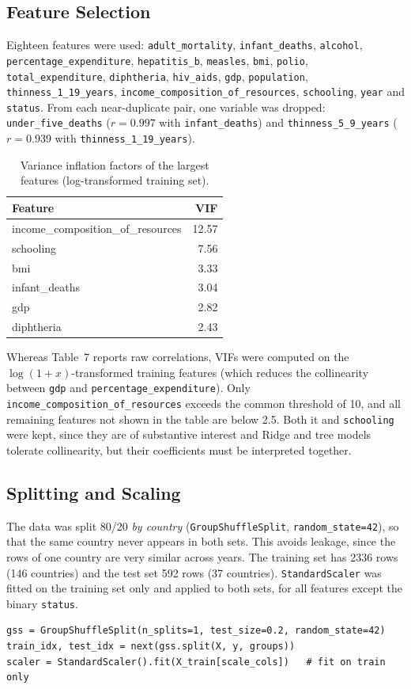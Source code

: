 \documentclass[12pt,a4paper]{article}
\begin{document}
\subsection{Feature Selection}
Eighteen features were used: \texttt{adult\_mortality}, \texttt{infant\_deaths}, \texttt{alcohol},
\texttt{percentage\_expenditure}, \texttt{hepatitis\_b}, \texttt{measles}, \texttt{bmi},
\texttt{polio}, \texttt{total\_expenditure}, \texttt{diphtheria}, \texttt{hiv\_aids}, \texttt{gdp},
\texttt{population}, \texttt{thinness\_1\_19\_years}, \texttt{income\_composition\_of\_resources},
\texttt{schooling}, \texttt{year} and \texttt{status}. From each near-duplicate pair, one variable
was dropped: \texttt{under\_five\_deaths} ($r=0.997$ with \texttt{infant\_deaths}) and
\texttt{thinness\_5\_9\_years} ($r=0.939$ with \texttt{thinness\_1\_19\_years}).

\begin{table}[H]\centering
\caption{Variance inflation factors of the largest features (log-transformed training set).}
\begin{tabular}{lr}\toprule
\textbf{Feature} & \textbf{VIF}\\\midrule
income\_composition\_of\_resources & 12.57\\
schooling & 7.56\\
bmi & 3.33\\
infant\_deaths & 3.04\\
gdp & 2.82\\
diphtheria & 2.43\\\bottomrule
\end{tabular}\end{table}
Whereas Table~7 reports raw correlations, VIFs were computed on the $\log(1+x)$-transformed
training features (which reduces the collinearity between \texttt{gdp} and
\texttt{percentage\_expenditure}). Only \texttt{income\_composition\_of\_resources} exceeds the
common threshold of 10, and all remaining features not shown in the table are below 2.5. Both it
and \texttt{schooling} were kept, since they are of substantive interest and Ridge and tree models
tolerate collinearity, but their coefficients must be interpreted together.

\newpage

\subsection{Splitting and Scaling}
The data was split 80/20 \emph{by country} (\texttt{GroupShuffleSplit}, \texttt{random\_state=42}),
so that the same country never appears in both sets. This avoids leakage, since the rows of one
country are very similar across years. The training set has 2336 rows (146 countries) and the test
set 592 rows (37 countries). \texttt{StandardScaler} was fitted on the training set only and applied
to both sets, for all features except the binary \texttt{status}.
\begin{lstlisting}
gss = GroupShuffleSplit(n_splits=1, test_size=0.2, random_state=42)
train_idx, test_idx = next(gss.split(X, y, groups))
scaler = StandardScaler().fit(X_train[scale_cols])   # fit on train only
\end{lstlisting}
\end{document}
